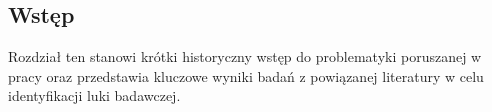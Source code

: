 \subsection{Wstęp}

Rozdział ten stanowi krótki historyczny wstęp do problematyki poruszanej w pracy oraz przedstawia kluczowe wyniki badań z powiązanej literatury w celu identyfikacji luki badawczej.
